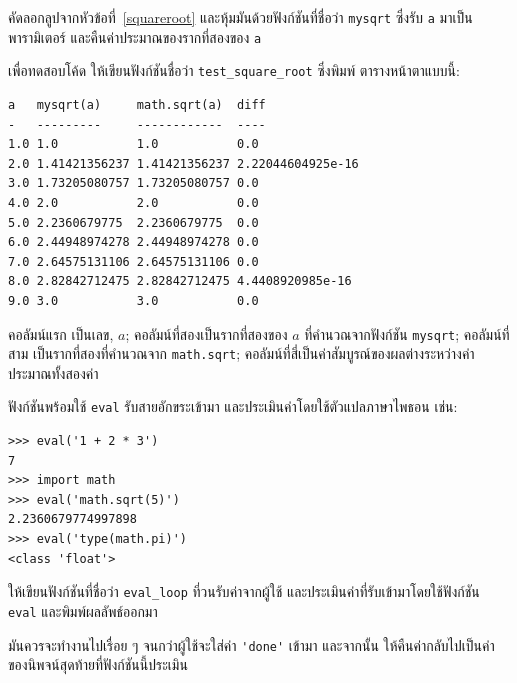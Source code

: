\begin{exercise}

คัดลอกลูปจากหัวข้อที่~\ref{squareroot} และหุ้มมันด้วยฟังก์ชันที่ชื่อว่า \verb"mysqrt"
ซึ่งรับ {\tt a} มาเป็นพารามิเตอร์ และคืนค่าประมาณของรากที่สองของ {\tt a}

เพื่อทดสอบโค้ด ให้เขียนฟังก์ชันชื่อว่า \verb"test_square_root" ซึ่งพิมพ์
ตารางหน้าตาแบบนี้:

\begin{verbatim}
a   mysqrt(a)     math.sqrt(a)  diff
-   ---------     ------------  ----
1.0 1.0           1.0           0.0
2.0 1.41421356237 1.41421356237 2.22044604925e-16
3.0 1.73205080757 1.73205080757 0.0
4.0 2.0           2.0           0.0
5.0 2.2360679775  2.2360679775  0.0
6.0 2.44948974278 2.44948974278 0.0
7.0 2.64575131106 2.64575131106 0.0
8.0 2.82842712475 2.82842712475 4.4408920985e-16
9.0 3.0           3.0           0.0
\end{verbatim}
% 
คอลัมน์แรก เป็นเลข, {\scriptsize$a$}; คอลัมน์ที่สองเป็นรากที่สองของ {\scriptsize$a$} ที่คำนวณจากฟังก์ชัน
\verb"mysqrt"; คอลัมน์ที่สาม เป็นรากที่สองที่คำนวณจาก {\tt math.sqrt};  
คอลัมน์ที่สี่เป็นค่าสัมบูรณ์ของผลต่างระหว่างค่าประมาณทั้งสองค่า
\end{exercise}


\begin{exercise}

ฟังก์ชันพร้อมใช้ {\tt eval} รับสายอักขระเข้ามา และประเมินค่าโดยใช้ตัวแปลภาษาไพธอน
เช่น:

\begin{verbatim}
>>> eval('1 + 2 * 3')
7
>>> import math
>>> eval('math.sqrt(5)')
2.2360679774997898
>>> eval('type(math.pi)')
<class 'float'>
\end{verbatim}
%
ให้เขียนฟังก์ชันที่ชื่อว่า \verb"eval_loop" ที่วนรับค่าจากผู้ใช้ 
และประเมินค่าที่รับเข้ามาโดยใช้ฟังก์ชัน {\tt eval} และพิมพ์ผลลัพธ์ออกมา

มันควรจะทำงานไปเรื่อย ๆ จนกว่าผู้ใช้จะใส่ค่า \verb"'done'" เข้ามา และจากนั้น
ให้คืนค่ากลับไปเป็นค่าของนิพจน์สุดท้ายที่ฟังก์ชันนี้ประเมิน

\end{exercise}


